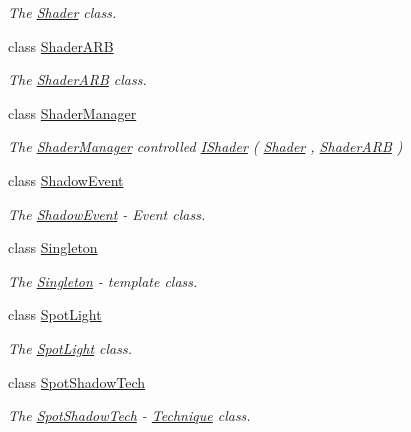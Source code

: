 \begin{DoxyCompactItemize}
\begin{DoxyCompactList}\small\item\em The \hyperlink{classEngine_1_1Shader}{Shader} class. \end{DoxyCompactList}\item 
class \hyperlink{classEngine_1_1ShaderARB}{Shader\+A\+R\+B}
\begin{DoxyCompactList}\small\item\em The \hyperlink{classEngine_1_1ShaderARB}{Shader\+A\+R\+B} class. \end{DoxyCompactList}\item 
class \hyperlink{classEngine_1_1ShaderManager}{Shader\+Manager}
\begin{DoxyCompactList}\small\item\em The \hyperlink{classEngine_1_1ShaderManager}{Shader\+Manager} controlled \hyperlink{classEngine_1_1IShader}{I\+Shader} ( \hyperlink{classEngine_1_1Shader}{Shader} , \hyperlink{classEngine_1_1ShaderARB}{Shader\+A\+R\+B} ) \end{DoxyCompactList}\item 
class \hyperlink{classEngine_1_1ShadowEvent}{Shadow\+Event}
\begin{DoxyCompactList}\small\item\em The \hyperlink{classEngine_1_1ShadowEvent}{Shadow\+Event} -\/ Event class. \end{DoxyCompactList}\item 
class \hyperlink{classEngine_1_1Singleton}{Singleton}
\begin{DoxyCompactList}\small\item\em The \hyperlink{classEngine_1_1Singleton}{Singleton} -\/ template class. \end{DoxyCompactList}\item 
class \hyperlink{classEngine_1_1SpotLight}{Spot\+Light}
\begin{DoxyCompactList}\small\item\em The \hyperlink{classEngine_1_1SpotLight}{Spot\+Light} class. \end{DoxyCompactList}\item 
class \hyperlink{classEngine_1_1SpotShadowTech}{Spot\+Shadow\+Tech}
\begin{DoxyCompactList}\small\item\em The \hyperlink{classEngine_1_1SpotShadowTech}{Spot\+Shadow\+Tech} -\/ \hyperlink{classEngine_1_1Technique}{Technique} class. \end{DoxyCompactList}\item 

\end{DoxyCompactItemize}
